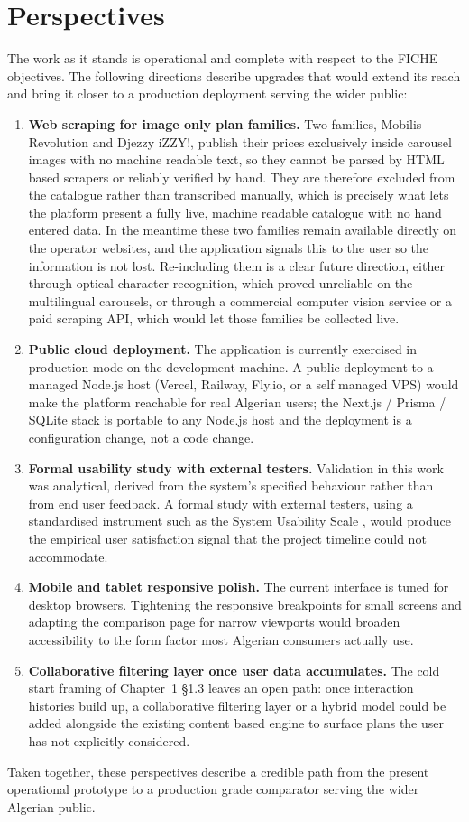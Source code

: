 \section*{Perspectives}

The work as it stands is operational and complete with respect to the FICHE objectives. The following directions describe upgrades that would extend its reach and bring it closer to a production deployment serving the wider public:

\begin{enumerate}
  \item \textbf{Web scraping for image only plan families.} Two families, Mobilis Revolution and Djezzy iZZY!, publish their prices exclusively inside carousel images with no machine readable text, so they cannot be parsed by HTML based scrapers or reliably verified by hand. They are therefore excluded from the catalogue rather than transcribed manually, which is precisely what lets the platform present a fully live, machine readable catalogue with no hand entered data. In the meantime these two families remain available directly on the operator websites, and the application signals this to the user so the information is not lost. Re-including them is a clear future direction, either through optical character recognition, which proved unreliable on the multilingual carousels, or through a commercial computer vision service or a paid scraping API, which would let those families be collected live.
  \item \textbf{Public cloud deployment.} The application is currently exercised in production mode on the development machine. A public deployment to a managed Node.js host (Vercel, Railway, Fly.io, or a self managed VPS) would make the platform reachable for real Algerian users; the Next.js / Prisma / SQLite stack is portable to any Node.js host and the deployment is a configuration change, not a code change.
  \item \textbf{Formal usability study with external testers.} Validation in this work was analytical, derived from the system's specified behaviour rather than from end user feedback. A formal study with external testers, using a standardised instrument such as the System Usability Scale \parencite{NielsenNorman2023}, would produce the empirical user satisfaction signal that the project timeline could not accommodate.
  \item \textbf{Mobile and tablet responsive polish.} The current interface is tuned for desktop browsers. Tightening the responsive breakpoints for small screens and adapting the comparison page for narrow viewports would broaden accessibility to the form factor most Algerian consumers actually use.
  \item \textbf{Collaborative filtering layer once user data accumulates.} The cold start framing of Chapter~1 §1.3 leaves an open path: once interaction histories build up, a collaborative filtering layer or a hybrid model \parencite{hu2008collaborative, AdomaviciusTuzhilin2005, BernardiKamps2016} could be added alongside the existing content based engine to surface plans the user has not explicitly considered.
\end{enumerate}

Taken together, these perspectives describe a credible path from the present operational prototype to a production grade comparator serving the wider Algerian public.
